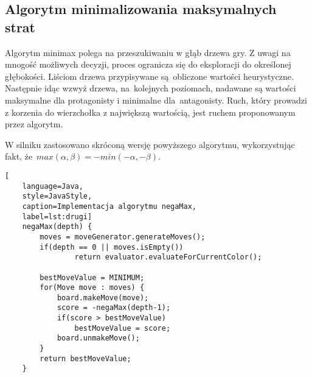 \subsection{Algorytm minimalizowania maksymalnych strat}
\label{subsec:algorytm-minimalizowania-maksymalnych-strat}

Algorytm minimax polega na przeszukiwaniu w głąb drzewa gry.
Z uwagi na mnogość możliwych decyzji, proces ogranicza się do eksploracji do określonej głębokości.
Liściom drzewa przypisywane są~obliczone wartości heurystyczne.
Następnie idąc wzwyż drzewa, na~kolejnych poziomach, nadawane są wartości maksymalne dla protagonisty i minimalne dla~antagonisty.
Ruch, który prowadzi z korzenia do wierzchołka z największą wartością, jest ruchem proponowanym przez algorytm.

W silniku zastosowano skróconą wersję powyższego algorytmu, wykorzystując fakt, że~$max(\alpha, \beta) = -min(-\alpha, -\beta)$.

\newpage


\begin{lstlisting}[
    language=Java,
    style=JavaStyle,
    caption=Implementacja algorytmu negaMax,
    label=lst:drugi]
    negaMax(depth) {
        moves = moveGenerator.generateMoves();
        if(depth == 0 || moves.isEmpty())
                return evaluator.evaluateForCurrentColor();

        bestMoveValue = MINIMUM;
        for(Move move : moves) {
            board.makeMove(move);
            score = -negaMax(depth-1);
            if(score > bestMoveValue)
                bestMoveValue = score;
            board.unmakeMove();
        }
        return bestMoveValue;
    }
\end{lstlisting}


